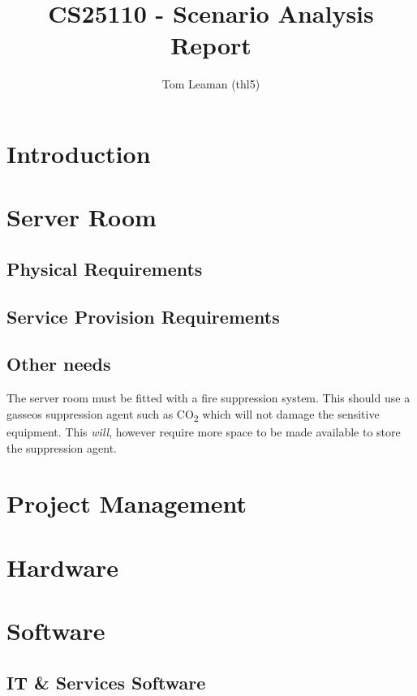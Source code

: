 \documentclass[a4paper, twoside]{article}
\title{CS25110 - Scenario Analysis Report}
\author{Tom Leaman (thl5)}
\begin{document}
\maketitle

\section{Introduction}

\section{Server Room}
\subsection{Physical Requirements}

\subsection{Service Provision Requirements}

\subsection{Other needs}
The server room must be fitted with a fire suppression system. This should use a
gasseos suppression agent such as CO\textsubscript{2} which will not damage the
sensitive equipment. This \emph{will}, however require more space to be made
available to store the suppression agent.


\section{Project Management}

\section{Hardware}

\section{Software}
\subsection{IT \& Services Software}
\end{document}
